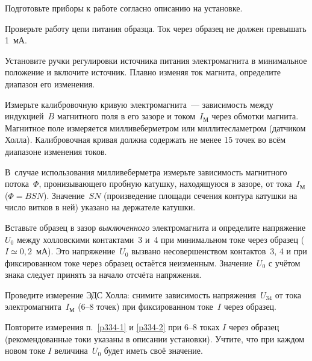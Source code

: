 \begin{lab:task}


\item Подготовьте приборы к работе согласно описанию на установке.

\item Проверьте работу цепи питания образца. Ток через образец не должен
превышать 1~мА.

\item Установите ручки регулировки источника питания электромагнита 
в минимальное положение и включите источник. 
Плавно изменяя ток магнита, определите диапазон его изменения.

\item Измерьте калибровочную кривую электромагнита~---
зависимость между индукцией~$B$ магнитного поля в его зазоре и 
током~$I_{М}$ через обмотки магнита.
Магнитное поле измеряется милливеберметром или миллитесламетром
(датчиком Холла). Калибровочная кривая должна содержать не менее
15 точек во всём диапазоне изменения токов.

В~случае использования милливеберметра измерьте зависимость 
магнитного потока~$\Phi$, пронизывающего пробную катушку, 
находящуюся в зазоре, от тока~$I_{М}$ ($\Phi=BSN$). 
Значение~$SN$ (произведение площади сечения контура катушки на
число витков в ней) указано на держателе катушки.

\item \label{p334-1} Вставьте образец в зазор \emph{выключенного} электромагнита 
и определите напряжение $U_0$ между холловскими
контактами~3 и~4 при минимальном токе через образец ($I\simeq 0,2$~мА). Это
напряжение~$U_0$ вызвано несовершенством контактов~3, 4 и при фиксированном токе
через образец остаётся неизменным. Значение~$U_0$ с учётом знака следует принять
за начало отсчёта напряжения.

\item \label{p334-2} Проведите измерение ЭДС Холла: снимите зависимость напряжения~$U_{34}$ 
от тока электромагнита~$I_{М}$ (6--8 точек) при фиксированном токе~$I$ 
через образец.

\item Повторите измерения п.~\ref{p334-1} и \ref{p334-2} при 6--8 токах $I$ через образец
(рекомендованные токи указаны в описании установки).  
Учтите, что при каждом новом токе $I$ величина~$U_0$ будет иметь 
своё значение.


\end{lab:task}
